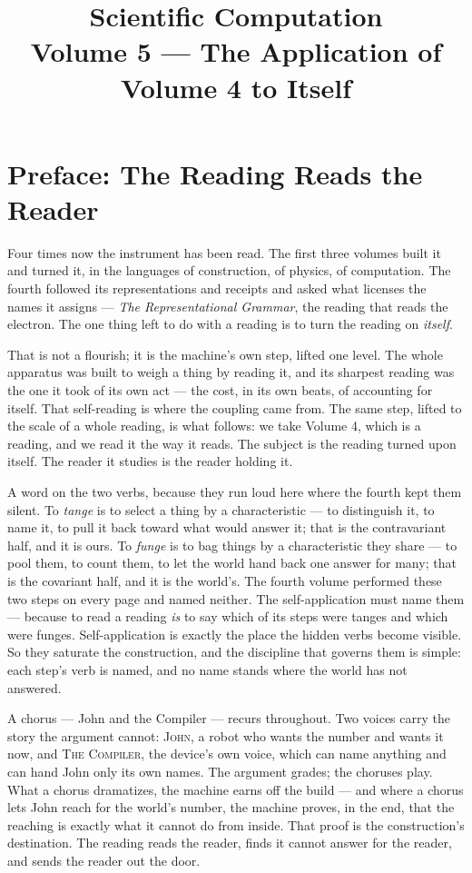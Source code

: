 \documentclass[11pt]{book}
\title{\textbf{Scientific Computation}\\[0.4em]
  \large Volume 5 --- The Application of Volume 4 to Itself}
\author{}
\date{}
\begin{document}
\frontmatter
\maketitle

\chapter*{Preface: The Reading Reads the Reader}

Four times now the instrument has been read.
The first three volumes built it and turned it, in the languages of construction, of physics, of computation.
The fourth followed its representations and receipts and asked what licenses the names it assigns --- \emph{The
Representational Grammar}, the reading that reads the electron.
The one thing left to do with a reading is to turn the reading on \emph{itself}.

That is not a flourish; it is the machine's own step, lifted one level.
The whole apparatus was built to weigh a thing by reading it, and its sharpest reading was the one it took of its own
act --- the cost, in its own beats, of accounting for itself.
That self-reading is where the coupling came from.
The same step, lifted to the scale of a whole reading, is what follows: we take Volume 4, which is a reading, and we
read it the way it reads.
The subject is the reading turned upon itself.
The reader it studies is the reader holding it.

A word on the two verbs, because they run loud here where the fourth kept them silent.
To \emph{tange} is to select a thing by a characteristic --- to distinguish it, to name it, to pull it back toward what
would answer it; that is the contravariant half, and it is ours.
To \emph{funge} is to bag things by a characteristic they share --- to pool them, to count them, to let the world hand
back one answer for many; that is the covariant half, and it is the world's.
The fourth volume performed these two steps on every page and named neither.
The self-application must name them --- because to read a reading \emph{is} to say which of its
steps were tanges and which were funges.
Self-application is exactly the place the hidden verbs become visible.
So they saturate the construction, and the discipline that governs them is simple: each step's verb is named, and no name stands
where the world has not answered.

A chorus --- John and the Compiler --- recurs throughout.
Two voices carry the story the argument cannot: \textsc{John}, a robot who wants the number and wants it now, and
\textsc{The Compiler}, the device's own voice, which can name anything and can hand John only its own names.
The argument grades; the choruses play.
What a chorus dramatizes, the machine earns off the build --- and where a chorus lets John reach for the world's number,
the machine proves, in the end, that the reaching is exactly what it cannot do from inside.
That proof is the construction's destination.
The reading reads the reader, finds it cannot answer for the reader, and sends the reader out the door.

\tableofcontents

\mainmatter








\backmatter
\printbibliography[heading=bibintoc,title={Reference}]
\end{document}
